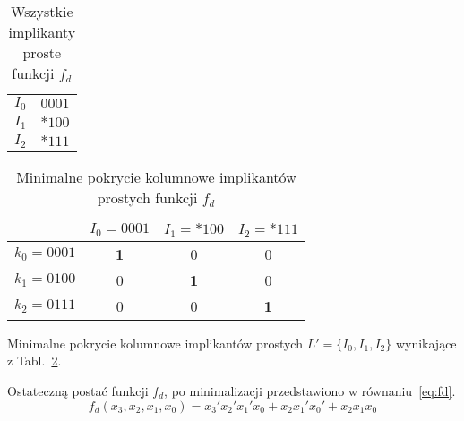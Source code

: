 \begin{table}[H]
    \centering
    \begin{tabular}[t]{ |c|c| }
        \hline
        $I_0$ & $0001$ \\
        $I_1$ & ${*}100$ \\
        $I_2$ & ${*}111$ \\
        \hline
    \end{tabular}
    \caption{Wszystkie implikanty proste funkcji $f_d$} \label{tab:all-implicantsd}
\end{table}

\begin{table}[H]
    \centering
    \begin{tabular}[t]{ |c||c|c|c| }
        \hline
        & $I_0 = 0001$ & $I_1 = {*}100$ & $I_2 = {*}111$ \\
        \hline
        \hline
        $k_0 = 0001$ & \textbf{1} & 0 & 0 \\
        \hline
        $k_1 = 0100$ & 0 & \textbf{1} &  0 \\
        \hline
        $k_2 = 0111$ & 0 & 0 & \textbf{1} \\
        \hline
    \end{tabular}
    \caption{Minimalne pokrycie kolumnowe implikantów prostych funkcji $f_d$}
    \label{tab:min-blockd}
\end{table}
Minimalne pokrycie kolumnowe implikantów prostych $L' = \{I_0, I_1, I_2\}$ wynikające z Tabl.~\ref{tab:min-blockd}.

Ostateczną postać funkcji $f_d$, po minimalizacji przedstawiono w równaniu~\ref{eq:fd}.
\begin{equation}
    \label{eq:fd}
    f_d(x_3, x_2, x_1, x_0) = x_3'x_2'x_1'x_0 + x_{2}x_1'x_0' + x_{2}x_{1}x_{0}
\end{equation}
